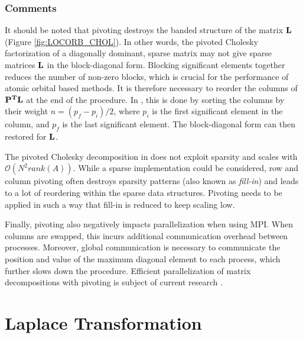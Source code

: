 \subsubsection{Comments}

It should be noted that pivoting destroys the banded structure of the matrix $\mathbf{L}$ (Figure \ref{fig:LOCORB_CHOL}). In other words, the pivoted Cholesky factorization of a diagonally dominant, sparse matrix may not give sparse matrices $\mathbf{L}$ in the block-diagonal form. Blocking significant elements together reduces the number of non-zero blocks, which is crucial for the performance of atomic orbital based methods. It is therefore necessary to reorder the columns of $\mathbf{P^TL}$ at the end of the procedure. In \mchem{}, this is done by sorting the columns by their weight $n = (p_f - p_i) / 2$, where $p_i$ is the first significant element in the column, and $p_f$ is the last significant element. The block-diagonal form can then restored for $\mathbf{L}$. 

The pivoted Cholesky decomposition in \mchem{} does not exploit sparsity and scales with $\mathcal{O}(N^2rank(A))$. While a sparse implementation could be considered, row and column pivoting often destroys sparsity patterns (also known as \emph{fill-in}) and leads to a lot of reordering within the sparse data structures. Pivoting needs to be applied in such a way that fill-in is reduced to keep scaling low. 

Finally, pivoting also negatively impacts parallelization when using MPI. When columns are swapped, this incurs additional communication overhead between processes. Moreover, global communication is necessary to communicate the position and value of the maximum diagonal element to each process, which further slows down the procedure. Efficient parallelization of matrix decompositions with pivoting is subject of current research \cite{Xia2016,Xia2017}.

\section{Laplace Transformation \label{sec:LAPLACE}}

